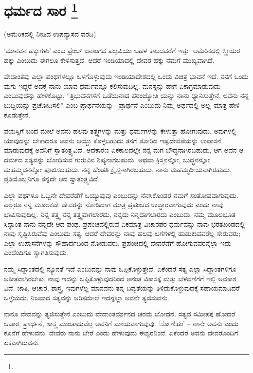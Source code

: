 
\chapter[ಧರ್ಮದ ಸಾರ ]{ಧರ್ಮದ ಸಾರ \protect\footnote{}}

\centerline{(ಅಮೆರಿಕದಲ್ಲಿ ನೀಡಿದ ಉಪನ್ಯಾಸದ ವರದಿ)}

‘ಮಾನವನ ಹಕ್ಕುಗಳು’ ಎಂಬ ಫ್ರೆಂಚ್​ ಜನಾಂಗದ ಪಲ್ಲವಿಯು ಬಹಳ ಕಾಲದವರೆಗೆ ಇತ್ತು. ಅಮೆರಿಕದಲ್ಲಿ ಸ್ತ್ರೀಯರ ಹಕ್ಕು ಎಂಬುದು ಈಗಲೂ ಕೇಳಿಸುತ್ತದೆ. ಆದರೆ ಇಂಡಿಯಾದಲ್ಲಿ ದೇವರ ಹಕ್ಕು ನಮಗೆ ಮುಖ್ಯವಾಗಿದೆ.

ವೇದಾಂತವು ಎಲ್ಲಾ ಪಂಥಗಳಲ್ಲೂ ಒಳಗೊಳ್ಳುವುದು ಇಂಡಿಯಾದೇಶದಲ್ಲಿ ಒಂದು ವಿಚಿತ್ರ ಭಾವನೆ ಇದೆ. ನನಗೆ ಒಂದು ಮಗು ಇದ್ದರೆ ಅದಕ್ಕೆ ನಾನು ಯಾವ ಧರ್ಮವನ್ನೂ ಕಲಿಸುವುದಿಲ್ಲ. ಮನಸ್ಸನ್ನು ಹೇಗೆ ಏಕಾಗ್ರಮಾಡುವುದು ಎಂಬುವುದನ್ನು ಹೇಳಿಕೊಟ್ಟು, “ತ್ರಿಭುವನಗಳಿಗೆ ಒಡೆಯನಾದ ಪರಂಜ್ಯೋತಿ ಯನ್ನು ನಾನು ಧ್ಯಾನಿಸುತ್ತೇನೆ, ಅವನು ನನ್ನ ಬುದ್ದಿಯನ್ನು ಪ್ರಚೋದಿಸಲಿ” ಎಂಬ ಪ್ರಾರ್ಥನೆಯನ್ನು– ಪ್ರಾರ್ಥನೆ ಎಂಬುದು ನಿಮ್ಮ ಅರ್ಥದಲ್ಲಿ ಅಲ್ಲ–ಮಾತ್ರ ಹೇಳಿ ಕೊಡುತ್ತೇನೆ.

ವಯಸ್ಸಿಗೆ ಬಂದ ಮೇಲೆ ಅವನು ಹಲವು ತತ್ತ್ವಗಳನ್ನು ಮತ್ತು ಧರ್ಮಗಳನ್ನು ಕೇಳುತ್ತಾ ಹೋಗುವುದು. ಅವುಗಳಲ್ಲಿ ಯಾವುದನ್ನು ಬೇಕಾದರೂ ಅವನು ಆಯ್ದು ಕೊಳ್ಳಬಹುದು ತನಗೆ ತೋರಿದ ಇಷ್ಟದೇವತೆಯನ್ನು ಉಪಾಸನೆ ಮಾಡುವುದಕ್ಕೆ ಅವನಿಗೆ ಸ್ವಾತಂತ್ರ್ಯವಿದೆ. ಆದಕಾರಣ ಏಕಕಾಲದಲ್ಲೇ ನನ್ನ ಮಗ ಬೌದ್ಧನಾಗಿರಬಹುದು, ಆಗ ಅವನ ಆ ಧರ್ಮದ ಸತ್ಯವನ್ನು ಬೋಧಿಸುವ ಗುರುವಿನ ಶಿಷ್ಯನಾಗಬಹುದು. ಅಥವಾ ಕ್ರಿಸ್ತನನ್ನೋ, ಬುದ್ಧನನ್ನೋ ಮಹಮ್ಮದನನ್ನೋ ಪೂಜಿಸಬಹುದು. ನನ್ನ ಹೆಂಡತಿ ಕ್ರೈಸ್ತಳಾಗಿರಬಹುದು, ನಾನು ಮಹಮ್ಮದೀಯನಾಗಿರಹುದು. ಪ್ರತಿಯೊಬ್ಬನಿಗೂ ತನ್ನದೇ ಆದ ಸ್ವಾತಂತ್ರ್ಯವಿದೆ.

ಎಲ್ಲಾ ಪಥಗಳೂ ಒಬ್ಬನೇ ದೇವರೆಡೆಗೆ ಒಯ್ಯುವುವು ಎಂಬುದನ್ನು ನೆನಸಿಕೊಂಡರೆ ನಮಗೆ ಸಂತೋಷವಾಗುವುದು. ಎಲ್ಲರೂ ನನ್ನ ಮೂಲಕವೇ
 ದೇವರನ್ನು ನೋಡಿದಾಗ ಮಾತ್ರ ಪ್ರಪಂಚದ ಉದ್ಧಾರವಾಗುವುದು ಎಂದು ನಾವು ಭಾವಿಸುವುದಿಲ್ಲ. ನಿನ್ನ ತತ್ತ್ವ ನನ್ನ ತತ್ತ್ವವಾಗಲಾರದು, ನನ್ನದು ನಿನ್ನದಾಗಲಾರದು ಎಂಬುದು. ನಮ್ಮ ಮೂಲಭೂತ ಸಿದ್ಧಾಂತ ನಾನು ನನ್ನದೇ ಆದ ಪಂಥ. ಪ್ರಪಂಚದಲ್ಲಿರುವ ಏಕಮಾತ್ರ ವಿಚಾರಪರ ಧರ್ಮವನ್ನು ನಾವು ಭರತಖಂಡದಲ್ಲಿ ನಾವು ಸೃಷ್ಟಿಸಿರುವೆವು ಎಂಬುದು ಸತ್ಯ. ಆದರೆ ದೇವರನ್ನು ನಾವು ಹಲವು ಬಗೆಗಳಲ್ಲಿ ಹುಡುಕುವವರೆಲ್ಲ ಸೇರುವರು; ಎಲ್ಲಾ ಉಪಾಸನೆಗಳನ್ನು ಸೌಹಾರ್ದದಿಂದ ನೋಡುವರು, ಪ್ರಪಂಚದಲ್ಲಿ ದೇವರೆಡೆಗೆ ಹೋಗುವವರನ್ನೆಲ್ಲಾ ಇದು ಎಂದೆಂದಿಗೂ ಸ್ವಾಗತಿಸುವುದು.

ನಮ್ಮ ಸಿದ್ಧಾಂತದಲ್ಲಿ ನ್ಯೂನತೆ ಇದೆ ಎಂಬುದನ್ನು ನಾವು ಒಪ್ಪಿಕೊಳ್ಳುತ್ತೇವೆ. ಏಕೆಂದರೆ ಸತ್ಯ ಎಲ್ಲಾ ಸಿದ್ಧಾಂತಗಳಿಗೂ ಅತೀತವಾಗಿರಬೇಕು. ನಾವು ಇದನ್ನು ಒಪ್ಪಿಕೊಳ್ಳುವುದರಿಂದ ಅನಂತ ವಿಕಾಸಕ್ಕೆ ಮತ್ತು ಬೆಳವಣಿಗೆಗೆ ಇಲ್ಲಿ ಅವಕಾಶ ವಿದೆ. ಜಾತಿ, ಆಚಾರ, ಶಾಸ್ತ್ರ, ಇವುಗಳೆಲ್ಲ ಮಾನವನು ತನ್ನ ದಿವ್ಯತೆಯನ್ನು ತಿಳಿದುಕೊಳ್ಳುವುದಕ್ಕೆ ಸಹಾಯಮಾಡಿದರೆ ಒಳ್ಳೆಯದು. ನಿಜವಾದ ಸತ್ಯವನ್ನು ಅರಿತಮೇಲೆ ಇದನ್ನೆಲ್ಲಾ ಅವನೇ ತ್ಯಜಿಸುವನು.

ನಾನೂ ವೇದವನ್ನು ತ್ಯಜಿಸುತ್ತೇನೆ ಎಂಬುದು ವೇದಾಂತದರ್ಶನದ ಚರಮ ಬೋಧನೆ. ಸತ್ಯದ ಸಮೀಪಕ್ಕೆ ಹೋದರೆ ಆಚಾರ, ಪ್ರಾರ್ಥನೆ, ಶಾಸ್ತ್ರ ಮುಂತಾದುವೆಲ್ಲ ಅವನಿಗೆ ಮಾಯವಾಗುವುವು. ‘ಸೋಣಿಹಂ’ – ನಾನೇ ಅವನು ಎಂದು ಕೊನೆಗೆ ಹೇಳುವನು. ದೇವರು ನಾನು ಬೇರೆ ಎಂದು ಹೇಳುವುದು ಈಶ್ವರನಿಂದೆ. ಏಕೆಂದರೆ ಅವನು ದೇವರೊಂದಿಗೆ ಏಕವಾಗಿರುವನು.

